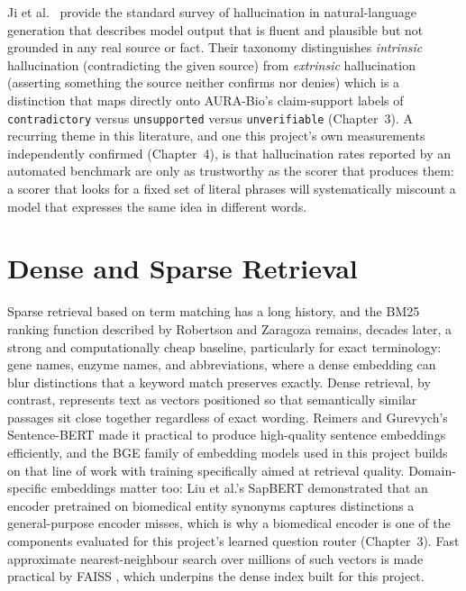 Ji et al.\ \cite{ji2023hallucination} provide the standard survey of
hallucination in natural-language generation that describes model output that is fluent
and plausible but not grounded in any real source or fact. Their taxonomy
distinguishes \emph{intrinsic} hallucination (contradicting the given
source) from \emph{extrinsic} hallucination (asserting something the source
neither confirms nor denies) which is a distinction that maps directly onto
AURA-Bio's claim-support labels of \texttt{contradictory} versus
\texttt{unsupported} versus \texttt{unverifiable} (Chapter~3). A recurring
theme in this literature, and one this project's own measurements
independently confirmed (Chapter~4), is that hallucination rates reported
by an automated benchmark are only as trustworthy as the scorer that
produces them: a scorer that looks for a fixed set of literal phrases will
systematically miscount a model that expresses the same idea in different
words.

\section{Dense and Sparse Retrieval}\label{2.4}

Sparse retrieval based on term matching has a long history, and the BM25
ranking function described by Robertson and Zaragoza
\cite{robertson2009bm25} remains, decades later, a strong and
computationally cheap baseline, particularly for exact terminology:
gene names, enzyme names, and abbreviations, where a dense embedding can
blur distinctions that a keyword match preserves exactly. Dense retrieval,
by contrast, represents text as vectors positioned so that semantically
similar passages sit close together regardless of exact wording. Reimers
and Gurevych's Sentence-BERT \cite{reimers2019sbert} made it practical to
produce high-quality sentence embeddings efficiently, and the BGE family of
embedding models \cite{xiao2023bge} used in this project builds on that
line of work with training specifically aimed at retrieval quality.
Domain-specific embeddings matter too: Liu et al.'s SapBERT
\cite{liu2021sapbert} demonstrated that an encoder pretrained on biomedical
entity synonyms captures distinctions a general-purpose encoder misses,
which is why a biomedical encoder is one of the components evaluated for
this project's learned question router (Chapter~3). Fast approximate
nearest-neighbour search over millions of such vectors is made practical by
FAISS \cite{johnson2019faiss}, which underpins the dense index built for
this project.


